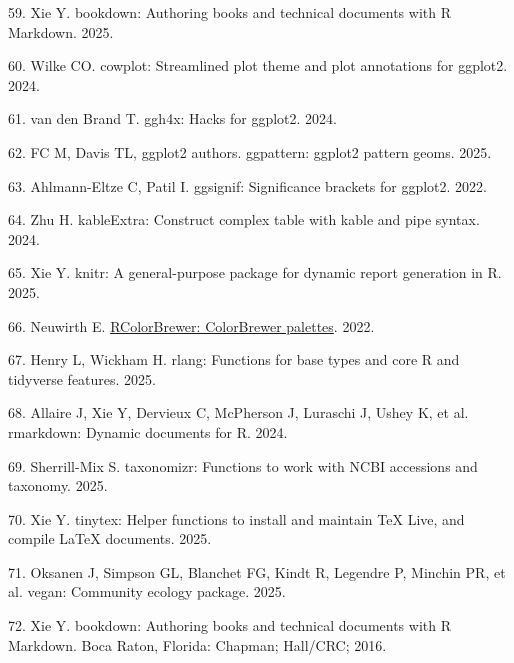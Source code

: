 \documentclass[
  12 pt,
]{article}
\newlength{\cslhangindent}
\newlength{\cslentryspacingunit} %
\newenvironment{CSLReferences}[2] %
 {%
  \setlength{\parindent}{0pt}
  \ifodd #1
  \let\oldpar\par
  \def\par{\hangindent=\cslhangindent\oldpar}
  \fi
  \setlength{\parskip}{#2\cslentryspacingunit}
 }%
 {}
\begin{document}
\begin{CSLReferences}{0}{0}
\leavevmode{}%
59. Xie Y. {bookdown}: Authoring books and technical documents with {R} {Markdown}. 2025.

\leavevmode{}%
60. Wilke CO. {cowplot}: Streamlined plot theme and plot annotations for ggplot2. 2024.

\leavevmode{}%
61. van den Brand T. ggh4x: Hacks for ggplot2. 2024.

\leavevmode{}%
62. FC M, Davis TL, ggplot2 authors. {ggpattern}: ggplot2 pattern geoms. 2025.

\leavevmode{}%
63. Ahlmann-Eltze C, Patil I. {ggsignif}: Significance brackets for ggplot2. 2022.

\leavevmode{}%
64. Zhu H. kableExtra: Construct complex table with kable and pipe syntax. 2024.

\leavevmode{}%
65. Xie Y. {knitr}: A general-purpose package for dynamic report generation in {R}. 2025.

\leavevmode{}%
66. Neuwirth E. \href{https://doi.org/10.32614/CRAN.package.RColorBrewer}{RColorBrewer: ColorBrewer palettes}. 2022.

\leavevmode{}%
67. Henry L, Wickham H. {rlang}: Functions for base types and core {R} and tidyverse features. 2025.

\leavevmode{}%
68. Allaire J, Xie Y, Dervieux C, McPherson J, Luraschi J, Ushey K, et al. {rmarkdown}: Dynamic documents for {R}. 2024.

\leavevmode{}%
69. Sherrill-Mix S. {taxonomizr}: Functions to work with NCBI accessions and taxonomy. 2025.

\leavevmode{}%
70. Xie Y. {tinytex}: Helper functions to install and maintain {TeX Live}, and compile LaTeX documents. 2025.

\leavevmode{}%
71. Oksanen J, Simpson GL, Blanchet FG, Kindt R, Legendre P, Minchin PR, et al. {vegan}: Community ecology package. 2025.

\leavevmode{}%
72. Xie Y. {bookdown}: Authoring books and technical documents with {R} {Markdown}. Boca Raton, Florida: Chapman; Hall/CRC; 2016.


\end{CSLReferences}
\end{document}
